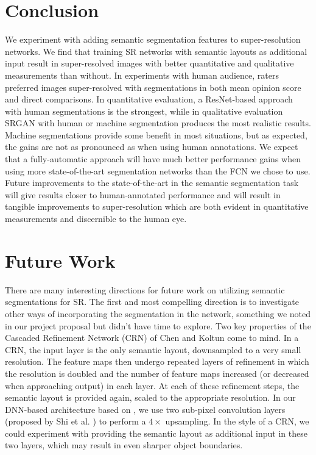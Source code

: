 \documentclass[10pt,twocolumn,letterpaper]{article}
\begin{document}

\section{Conclusion}
\label{sec:conclusion}
We experiment with adding semantic segmentation features to super-resolution
networks. We find that training SR networks with semantic layouts as additional
input result in super-resolved images with better quantitative and qualitative
measurements than without. In experiments with human audience, raters preferred
images super-resolved with segmentations in both mean opinion score and direct
comparisons. In quantitative evaluation, a ResNet-based approach with human
segmentations is the strongest, while in qualitative evaluation SRGAN with
human or machine segmentation produces the most realistic results. Machine
segmentations provide some benefit in most situations, but as expected, the
gains are not as pronounced as when using human annotations. We expect that a
fully-automatic approach will have much better performance gains when using
more state-of-the-art segmentation networks than the FCN we chose to use.
Future improvements to the state-of-the-art in the semantic segmentation task
will give results closer to human-annotated performance and will result in
tangible improvements to super-resolution which are both evident in
quantitative measurements and discernible to the human eye.


\section{Future Work}
There are many interesting directions for future work on utilizing semantic
segmentations for SR. The first and most compelling direction is to investigate
other ways of incorporating the segmentation in the network, something we noted
in our project proposal but didn't have time to explore. Two key properties of
the Cascaded Refinement Network (CRN) of Chen and Koltun \cite{ImageSynthesis}
come to mind. In a CRN, the input layer is the only semantic layout,
downsampled to a very small resolution. The feature maps then undergo repeated
layers of refinement in which the resolution is doubled and the number of
feature maps increased (or decreased when approaching output) in each layer. At
each of these refinement steps, the semantic layout is provided again, scaled
to the appropriate resolution. In our DNN-based architecture based on
\cite{SRGAN}, we use two sub-pixel convolution layers (proposed by Shi et al.
\cite{SubPixelConv}) to perform a $4 \times$ upsampling. In the style of a CRN,
we could experiment with providing the semantic layout as additional input in
these two layers, which may result in even sharper object boundaries.
\end{document}

